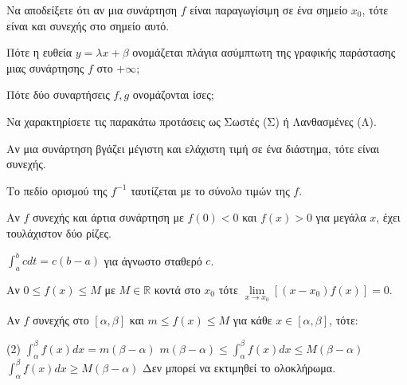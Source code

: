 \documentclass[11pt,a4paper]{article}
\newcommand{\kerkissans}[1]{{\fontfamily{maksf}\selectfont \textbf{#1}}}
\renewcommand{\textdexiakeraia}{}
\newcommand{\dint}{\displaystyle\int}
\newcommand\themanum{A}
\newcounter{thema}[section]
\renewcommand{\thethema}{\arabic{thema}}
\newcommand{\Thema}{\refstepcounter{thema}{\textbf{\textcolor{black}{\faPenSquare\ \  \large \kerkissans{\textbf{\thethemaο\hspace{2mm}Διαγώνισμα - Θέμα \themanum}}}}}\hspace{0mm}}{}
\newenvironment{thema}[1]
{\begin{tcolorbox}[title=\Thema\kerkissans{\textbf{\large{  #1}}},breakable,
enhanced standard,titlerule=0pt,toprule=0pt, rightrule=0pt, bottomrule=0pt,
colback=white,left=0mm,top=1mm,bottom=0mm,
boxrule=0pt,
colframe=white,leftrule=0mm,sharp corners,coltitle=black]
\renewcommand{\themanum}{#1}}
{\end{tcolorbox}}
\begin{document}
\begin{thema}{A}
\begin{erwthma}
    \item Να αποδείξετε ότι αν μια συνάρτηση $f$ είναι παραγωγίσιμη σε ένα σημείο $x_0$, τότε είναι και συνεχής στο σημείο αυτό.
    \item Πότε η ευθεία $y=\lambda x+\beta$ ονομάζεται πλάγια ασύμπτωτη της γραφικής παράστασης μιας συνάρτησης $f$ στο $+\infty$;
    \item Πότε δύο συναρτήσεις $f, g$ ονομάζονται ίσες;
    \item Να χαρακτηρίσετε τις παρακάτω προτάσεις ως Σωστές (Σ) ή Λανθασμένες (Λ).
    \begin{alist}
        \item Αν μια συνάρτηση βγάζει μέγιστη και ελάχιστη τιμή σε ένα διάστημα, τότε είναι συνεχής.
        \item Το πεδίο ορισμού της $f^{-1}$ ταυτίζεται με το σύνολο τιμών της $f$.
        \item Αν $f$ συνεχής και άρτια συνάρτηση με $f(0)<0$ και $f(x)>0$ για μεγάλα $x$, έχει τουλάχιστον δύο ρίζες.
        \item $\dint_a^b c dt = c(b-a)$ για άγνωστο σταθερό $c$.
        \item Αν $0\leq f(x)\leq M$ με $M\in\mathbb{R}$ κοντά στο $x_0$ τότε $\lim\limits_{x\to x_0}{\left[(x-x_0)f(x)\right]}=0$.
    \end{alist}
    \item Αν $f$ συνεχής στο $[\alpha, \beta]$ και $m \le f(x) \le M$ για κάθε $x \in [\alpha, \beta]$, τότε:
    \begin{tasks}[label=\let\textdexiakeraia\relax\alph*.](2)
        \task $\dint_\alpha^\beta f(x) dx = m(\beta - \alpha)$
        \task $m(\beta-\alpha) \le \dint_\alpha^\beta f(x) dx \le M(\beta-\alpha)$
        \task $\dint_\alpha^\beta f(x)dx \ge M(\beta-\alpha)$
        \task Δεν μπορεί να εκτιμηθεί το ολοκλήρωμα.
    \end{tasks}
\end{erwthma}
\end{thema}
\vspace{1cm}
\end{document}
